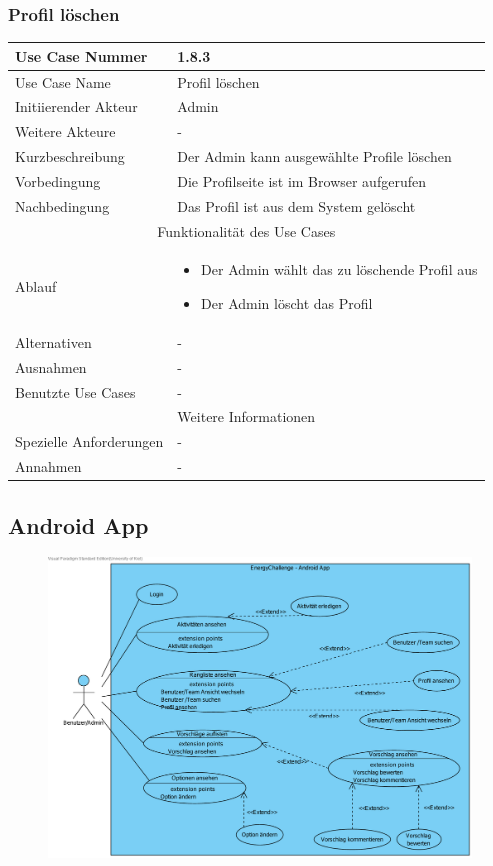 \documentclass[10pt,a4paper]{article}
\begin{document}
			\subsubsection{Profil l\"oschen}
		\begin{tabularx}{\textwidth}{|l|X|}
		\hline Use Case Nummer & 1.8.3 \\ 
		\hline Use Case Name & Profil l\"oschen \\ 
		\hline Initiierender Akteur & Admin \\
		\hline Weitere Akteure & - \\
		\hline Kurzbeschreibung & Der Admin kann ausgew\"ahlte Profile l\"oschen \\
		\hline Vorbedingung & Die Profilseite ist im Browser aufgerufen \\
		\hline Nachbedingung & Das Profil ist aus dem System gel\"oscht \\
		\hline \multicolumn{2}{|c|}{Funktionalität des Use Cases}\\
		\hline  Ablauf & \begin{itemize}
					\item Der Admin w\"ahlt das zu löschende Profil aus
					\item Der Admin l\"oscht das Profil
				\end{itemize}\\
		\hline Alternativen & - \\
		\hline Ausnahmen & - \\
		\hline Benutzte Use Cases & - \\
		\hline \multicolumn{2}{|c|}{Weitere Informationen} \\
		\hline Spezielle Anforderungen & - \\
		\hline Annahmen & - \\
		\hline
		\end{tabularx}

\subsection{Android App}
	\begin{figure}[H]
	\includegraphics[width=\linewidth]{gfx/androidapp/overview.pdf}
	\end{figure}
\end{document}
